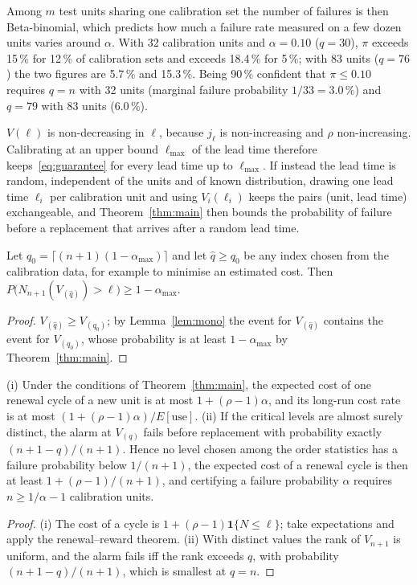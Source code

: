 Among $m$ test units sharing one calibration set the number of failures is then Beta-binomial, which predicts how much a failure rate measured on a few dozen units varies around $\alpha$. With 32 calibration units and $\alpha=0.10$ ($q=30$), $\pi$ exceeds 15\,\% for 12\,\% of calibration sets and exceeds 18.4\,\% for 5\,\%; with 83 units ($q=76$) the two figures are 5.7\,\% and 15.3\,\%. Being 90\,\% confident that $\pi\le0.10$ requires $q=n$ with 32 units (marginal failure probability $1/33=3.0\,\%$) and $q=79$ with 83 units (6.0\,\%).

\begin{remark}\label{rem:lead}
$V(\ell)$ is non-decreasing in $\ell$, because $j_\ell$ is non-increasing and $\rho$ non-increasing. Calibrating at an upper bound $\ell_{\max}$ of the lead time therefore keeps~\eqref{eq:guarantee} for every lead time up to $\ell_{\max}$. If instead the lead time is random, independent of the units and of known distribution, drawing one lead time $\ell_i$ per calibration unit and using $V_i(\ell_i)$ keeps the pairs (unit, lead time) exchangeable, and Theorem~\ref{thm:main} then bounds the probability of failure before a replacement that arrives after a random lead time.
\end{remark}

\begin{corollary}\label{cor:da}
Let $q_0=\lceil (n+1)(1-\alpha_{\max})\rceil$ and let $\hat q\ge q_0$ be any index chosen from the calibration data, for example to minimise an estimated cost. Then $P\bigl(N_{n+1}(V_{(\hat q)})>\ell\bigr)\ge 1-\alpha_{\max}$.
\end{corollary}
\begin{proof}
$V_{(\hat q)}\ge V_{(q_0)}$; by Lemma~\ref{lem:mono} the event for $V_{(\hat q)}$ contains the event for $V_{(q_0)}$, whose probability is at least $1-\alpha_{\max}$ by Theorem~\ref{thm:main}.
\end{proof}

\begin{proposition}\label{prop:cost}
(i) Under the conditions of Theorem~\ref{thm:main}, the expected cost of one renewal cycle of a new unit is at most $1+(\rho-1)\alpha$, and its long-run cost rate is at most $(1+(\rho-1)\alpha)/E[\text{use}]$. (ii) If the critical levels are almost surely distinct, the alarm at $V_{(q)}$ fails before replacement with probability exactly $(n+1-q)/(n+1)$. Hence no level chosen among the order statistics has a failure probability below $1/(n+1)$, the expected cost of a renewal cycle is then at least $1+(\rho-1)/(n+1)$, and certifying a failure probability $\alpha$ requires $n\ge 1/\alpha-1$ calibration units.
\end{proposition}
\begin{proof}
(i) The cost of a cycle is $1+(\rho-1)\mathbf 1\{N\le\ell\}$; take expectations and apply the renewal--reward theorem. (ii) With distinct values the rank of $V_{n+1}$ is uniform, and the alarm fails iff the rank exceeds $q$, with probability $(n+1-q)/(n+1)$, which is smallest at $q=n$.
\end{proof}

